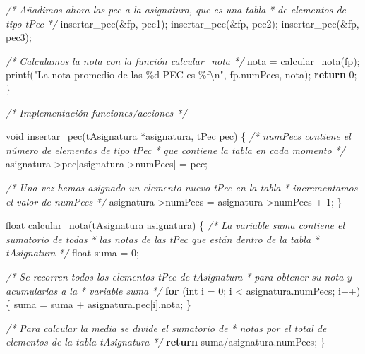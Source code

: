 \documentclass[
]{book}
\newenvironment{Shaded}{\begin{snugshade}}{\end{snugshade}}
\newcommand{\CommentTok}[1]{\textcolor[rgb]{0.56,0.35,0.01}{\textit{#1}}}
\newcommand{\ControlFlowTok}[1]{\textcolor[rgb]{0.13,0.29,0.53}{\textbf{#1}}}
\newcommand{\DataTypeTok}[1]{\textcolor[rgb]{0.13,0.29,0.53}{#1}}
\newcommand{\DecValTok}[1]{\textcolor[rgb]{0.00,0.00,0.81}{#1}}
\newcommand{\NormalTok}[1]{#1}
\newcommand{\SpecialCharTok}[1]{\textcolor[rgb]{0.00,0.00,0.00}{#1}}
\newcommand{\StringTok}[1]{\textcolor[rgb]{0.31,0.60,0.02}{#1}}
\begin{document}
\begin{Shaded}
\begin{Highlighting}[]
    \CommentTok{/* Añadimos ahora las pec a la asignatura, que es una tabla}
\CommentTok{     * de elementos de tipo tPec}
\CommentTok{     */}
\NormalTok{    insertar\_pec(\&fp, pec1);}
\NormalTok{    insertar\_pec(\&fp, pec2);}
\NormalTok{    insertar\_pec(\&fp, pec3);}

    \CommentTok{/* Calculamos la nota con la función calcular\_nota */}
\NormalTok{    nota = calcular\_nota(fp);}
\NormalTok{    printf(}\StringTok{"La nota promedio de las \%d PEC es \%f}\SpecialCharTok{\textbackslash{}n}\StringTok{"}\NormalTok{, fp.numPecs, nota);}
    \ControlFlowTok{return} \DecValTok{0}\NormalTok{;}
\NormalTok{\}}

\CommentTok{/* Implementación funciones/acciones */}

\DataTypeTok{void}\NormalTok{ insertar\_pec(tAsignatura *asignatura, tPec pec) \{}
    \CommentTok{/* numPecs contiene el número de elementos de tipo tPec}
\CommentTok{     * que contiene la tabla en cada momento}
\CommentTok{     */}
\NormalTok{    asignatura{-}\textgreater{}pec[asignatura{-}\textgreater{}numPecs] = pec;}

    \CommentTok{/* Una vez hemos asignado un elemento nuevo tPec en la tabla}
\CommentTok{     * incrementamos el valor de numPecs}
\CommentTok{     */}
\NormalTok{    asignatura{-}\textgreater{}numPecs = asignatura{-}\textgreater{}numPecs + }\DecValTok{1}\NormalTok{;}
\NormalTok{\}}

\DataTypeTok{float}\NormalTok{ calcular\_nota(tAsignatura asignatura) \{}
    \CommentTok{/* La variable suma contiene el sumatorio de todas}
\CommentTok{     * las notas de las tPec que están dentro de la tabla}
\CommentTok{     * tAsignatura}
\CommentTok{     */}
    \DataTypeTok{float}\NormalTok{ suma = }\DecValTok{0}\NormalTok{;}

    \CommentTok{/* Se recorren todos los elementos tPec de tAsignatura}
\CommentTok{     * para obtener su nota y acumularlas a la}
\CommentTok{     * variable suma}
\CommentTok{     */}
    \ControlFlowTok{for}\NormalTok{ (}\DataTypeTok{int}\NormalTok{ i = }\DecValTok{0}\NormalTok{; i \textless{} asignatura.numPecs; i++) \{}
\NormalTok{        suma = suma + asignatura.pec[i].nota;}
\NormalTok{    \}}

    \CommentTok{/* Para calcular la media se divide el sumatorio de}
\CommentTok{     * notas por el total de elementos de la tabla tAsignatura}
\CommentTok{     */}
    \ControlFlowTok{return}\NormalTok{ suma/asignatura.numPecs;}
\NormalTok{\}}
\end{Highlighting}
\end{Shaded}
\end{document}
